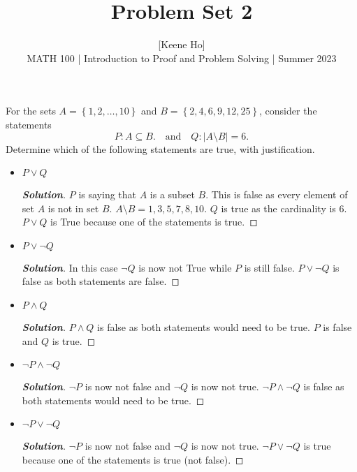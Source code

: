 \documentclass[11pt]{article}
\newenvironment{problem}[2][Problem\!]{\begin{trivlist}
\item[\hskip \labelsep {\bfseries #1}\hskip \labelsep {\bfseries #2.}]}{\end{trivlist}}
\newenvironment{solution}{\begin{proof}[\textbf{\textit{Solution}}]}{\end{proof}}
\newcommand{\abs}[1]{\left\lvert#1\right\rvert} %
\newcommand{\set}[1]{\left\{#1\right\}} %
\begin{document}
 
\title{Problem Set 2}
\author{[Keene Ho]\\[0.5em]
MATH 100 | Introduction to Proof and Problem Solving | Summer 2023}
\date{} 
\maketitle


\begin{problem}{2.1}
For the sets $A = \set{1, 2,\ldots,10}$ and $B = \set{2, 4, 6, 9, 12, 25}$, consider the statements
\[P: A \subseteq B. \quad \text{and} \quad Q: \abs{A \setminus B} = 6.\]
Determine which of the following statements are true, with justification.
\begin{itemize}[itemsep=3em]
\item[(a)] $P \lor Q$
\begin{solution}
\(P\) is saying that \(A\) is a subset \(B\). This is false as every element of set \(A\) is not in set \(B\). \(A \setminus B = {1, 3, 5, 7, 8, 10}\). \(Q\) is true as the cardinality is \(6\). \(P \lor Q\) is True because one of the statements is true.
\end{solution}

\item[(b)] $P \lor \neg Q$
\begin{solution}
In this case \(\neg Q\) is now not True while \(P\) is still false. \(P \lor \neg Q\) is false as both statements are false.
\end{solution}

\item[(c)] $P \land Q$
\begin{solution}
\(P \land Q\) is false as both statements would need to be true. \(P\) is false and \(Q\) is true.
\end{solution}

\item[(d)] $\neg P \land \neg Q$
\begin{solution}
\( \neg P\) is now not false and \( \neg Q\) is now not true. \(\neg P \land \neg Q\) is false as both statements would need to be true.
\end{solution}

\item[(e)] $\neg P \lor \neg Q$
\begin{solution}
\(\neg P\) is now not false and \( \neg Q\) is now not true. \(\neg P \lor \neg Q\) is true because one of the statements is true (not false).
\end{solution}

\end{itemize}
\end{problem}
\end{document}
